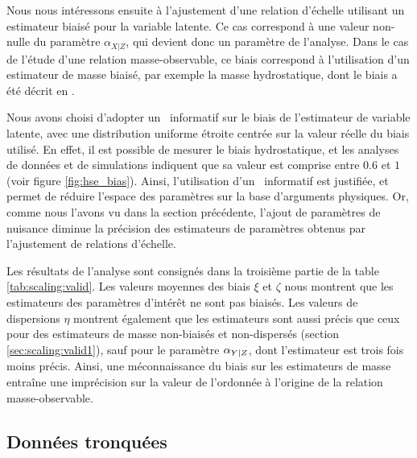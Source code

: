 Nous nous intéressons ensuite à l'ajustement d'une relation d'échelle utilisant un estimateur biaisé pour la variable latente.
Ce cas correspond à une valeur non-nulle du paramètre $\alpha_{X|Z}$, qui devient donc un paramètre de l'analyse.
Dans le cas de l'étude d'une relation masse-observable, ce biais correspond à l'utilisation d'un estimateur de masse biaisé, par exemple la masse hydrostatique, dont le biais a été décrit en .

Nous avons choisi d'adopter un \prior\ informatif sur le biais de l'estimateur de variable latente, avec une distribution uniforme étroite centrée sur la valeur réelle du biais utilisé.
En effet, il est possible de mesurer le biais hydrostatique, et les analyses de données et de simulations indiquent que sa valeur est comprise entre $0.6$ et $1$ (voir figure \ref{fig:hse_bias}).
Ainsi, l'utilisation d'un \prior\ informatif est justifiée, et permet de réduire l'espace des paramètres sur la base d'arguments physiques.
Or, comme nous l'avons vu dans la section précédente, l'ajout de paramètres de nuisance diminue la précision des estimateurs de paramètres obtenus par l'ajustement de relations d'échelle.

Les résultats de l'analyse sont consignés dans la troisième partie de la table \ref{tab:scaling:valid}.
Les valeurs moyennes des biais $\xi$ et $\zeta$ nous montrent que les estimateurs des paramètres d'intérêt ne sont pas biaisés.
Les valeurs de dispersions $\eta$ montrent également que les estimateurs sont aussi précis que ceux pour des estimateurs de masse non-biaisés et non-dispersés (section
\ref{sec:scaling:valid1}), sauf pour le paramètre $\alpha_{Y|Z}$, dont l'estimateur est trois fois moins précis.
Ainsi, une méconnaissance du biais sur les estimateurs de masse entraîne une imprécision sur la valeur de l'ordonnée à l'origine de la relation masse-observable.

\subsection{Données tronquées}
\label{sec:scaling:valid4}

